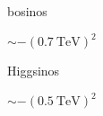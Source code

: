 \begin{frame}
\begin{minipage}[t]{.3\textwidth}
\begin{block}{bosinos}
\begin{center}
$\sim -(\SI{0.7}{\TeV})^2$
\end{center}
\end{block}
\end{minipage}
\hfill
\begin{minipage}[t]{.3\textwidth}
\begin{block}{Higgsinos}
\begin{center}
\vspace{-4.5pt}

\vspace{-4.5pt}

$\sim -(\SI{0.5}{\TeV})^2$
\end{center}
\end{block}
\end{minipage}

\end{frame}

%
%
%
%
%
%
%
%
